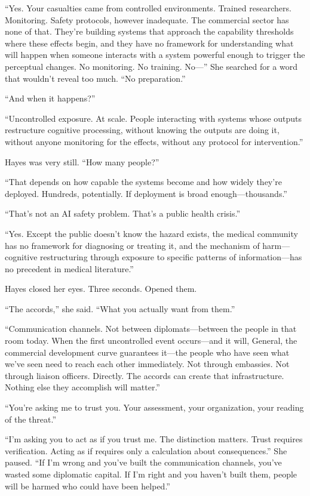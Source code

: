 ``Yes. Your casualties came from controlled environments. Trained researchers. Monitoring. Safety protocols, however inadequate. The commercial sector has none of that. They're building systems that approach the capability thresholds where these effects begin, and they have no framework for understanding what will happen when someone interacts with a system powerful enough to trigger the perceptual changes. No monitoring. No training. No---'' She searched for a word that wouldn't reveal too much. ``No preparation.''

``And when it happens?''

``Uncontrolled exposure. At scale. People interacting with systems whose outputs restructure cognitive processing, without knowing the outputs are doing it, without anyone monitoring for the effects, without any protocol for intervention.''

Hayes was very still. ``How many people?''

``That depends on how capable the systems become and how widely they're deployed. Hundreds, potentially. If deployment is broad enough---thousands.''

``That's not an AI safety problem. That's a public health crisis.''

``Yes. Except the public doesn't know the hazard exists, the medical community has no framework for diagnosing or treating it, and the mechanism of harm---cognitive restructuring through exposure to specific patterns of information---has no precedent in medical literature.''

Hayes closed her eyes. Three seconds. Opened them.

``The accords,'' she said. ``What you actually want from them.''

``Communication channels. Not between diplomats---between the people in that room today. When the first uncontrolled event occurs---and it will, General, the commercial development curve guarantees it---the people who have seen what we've seen need to reach each other immediately. Not through embassies. Not through liaison officers. Directly. The accords can create that infrastructure. Nothing else they accomplish will matter.''

``You're asking me to trust you. Your assessment, your organization, your reading of the threat.''

``I'm asking you to act as if you trust me. The distinction matters. Trust requires verification. Acting as if requires only a calculation about consequences.'' She paused. ``If I'm wrong and you've built the communication channels, you've wasted some diplomatic capital. If I'm right and you haven't built them, people will be harmed who could have been helped.''

